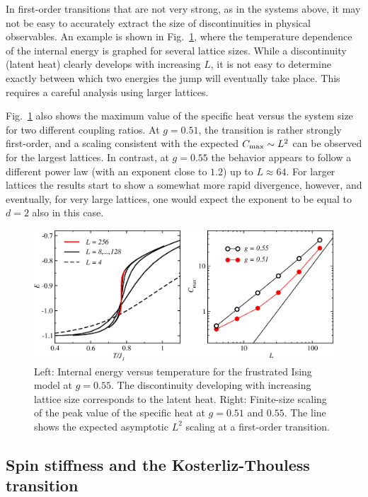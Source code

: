 \documentclass[draft,numberedheadings]{aipproc}
\begin{document}
In first-order transitions that are not very strong, as in the systems above, it may not be easy to accurately extract
the size of discontinuities in physical observables. An example is shown in Fig.~\ref{j1j2latent}, where the temperature dependence of the internal 
energy is graphed for several lattice sizes. While a discontinuity (latent heat) clearly develops with increasing $L$, it is not easy to determine 
exactly between which two energies the jump will eventually take place. This requires a careful analysis using larger lattices.

Fig.~\ref{j1j2latent} also shows the maximum value of the specific heat versus the system size for two different coupling ratios. At $g=0.51$, the
transition is rather strongly first-order, and a scaling consistent with the expected $C_{\rm max} \sim L^2$ can be observed for the largest lattices.
In contrast, at $g=0.55$ the behavior appears to follow a different power law (with an exponent close to $1.2$) up to $L \approx 64$. For larger lattices 
the results start to show a somewhat more rapid divergence, however, and eventually, for very large lattices, one would expect the exponent to be 
equal to $d=2$ also in this case. 

\begin{figure}
\includegraphics[width=12.5cm, clip]{j1j2latent.eps}
\caption{Left: Internal energy versus temperature for the frustrated Ising model at $g=0.55$. The discontinuity developing
with increasing lattice size corresponds to the latent heat. Right: Finite-size scaling of the peak value of the specific heat
at $g=0.51$ and $0.55$. The line shows the expected asymptotic $L^2$ scaling at a first-order transition.}
\label{j1j2latent}
\end{figure}

\subsection{Spin stiffness and the Kosterliz-Thouless transition}
\label{stiffkt}
\end{document}
